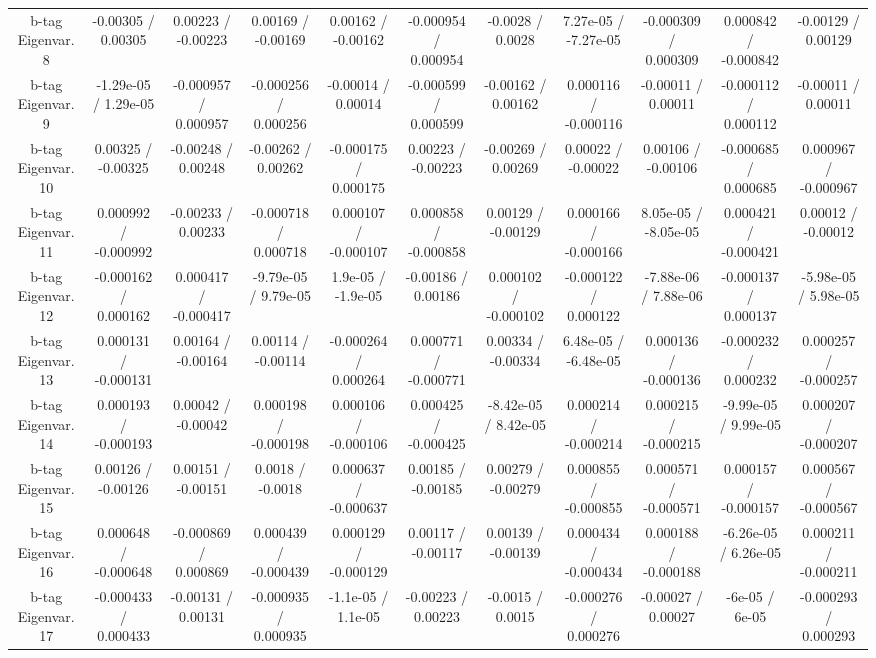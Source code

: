 \begin{table}[htbp]
\begin{center}
\begin{tabular}{|c|c|c|c|c|c|c|c|c|c|c|}
  b-tag Eigenvar. 8 & -0.00305 / 0.00305 & 0.00223 / -0.00223 & 0.00169 / -0.00169 & 0.00162 / -0.00162 & -0.000954 / 0.000954 & -0.0028 / 0.0028 & 7.27e-05 / -7.27e-05 & -0.000309 / 0.000309 & 0.000842 / -0.000842 & -0.00129 / 0.00129 \\ 
  b-tag Eigenvar. 9 & -1.29e-05 / 1.29e-05 & -0.000957 / 0.000957 & -0.000256 / 0.000256 & -0.00014 / 0.00014 & -0.000599 / 0.000599 & -0.00162 / 0.00162 & 0.000116 / -0.000116 & -0.00011 / 0.00011 & -0.000112 / 0.000112 & -0.00011 / 0.00011 \\ 
  b-tag Eigenvar. 10 & 0.00325 / -0.00325 & -0.00248 / 0.00248 & -0.00262 / 0.00262 & -0.000175 / 0.000175 & 0.00223 / -0.00223 & -0.00269 / 0.00269 & 0.00022 / -0.00022 & 0.00106 / -0.00106 & -0.000685 / 0.000685 & 0.000967 / -0.000967 \\ 
  b-tag Eigenvar. 11 & 0.000992 / -0.000992 & -0.00233 / 0.00233 & -0.000718 / 0.000718 & 0.000107 / -0.000107 & 0.000858 / -0.000858 & 0.00129 / -0.00129 & 0.000166 / -0.000166 & 8.05e-05 / -8.05e-05 & 0.000421 / -0.000421 & 0.00012 / -0.00012 \\ 
  b-tag Eigenvar. 12 & -0.000162 / 0.000162 & 0.000417 / -0.000417 & -9.79e-05 / 9.79e-05 & 1.9e-05 / -1.9e-05 & -0.00186 / 0.00186 & 0.000102 / -0.000102 & -0.000122 / 0.000122 & -7.88e-06 / 7.88e-06 & -0.000137 / 0.000137 & -5.98e-05 / 5.98e-05 \\ 
  b-tag Eigenvar. 13 & 0.000131 / -0.000131 & 0.00164 / -0.00164 & 0.00114 / -0.00114 & -0.000264 / 0.000264 & 0.000771 / -0.000771 & 0.00334 / -0.00334 & 6.48e-05 / -6.48e-05 & 0.000136 / -0.000136 & -0.000232 / 0.000232 & 0.000257 / -0.000257 \\ 
  b-tag Eigenvar. 14 & 0.000193 / -0.000193 & 0.00042 / -0.00042 & 0.000198 / -0.000198 & 0.000106 / -0.000106 & 0.000425 / -0.000425 & -8.42e-05 / 8.42e-05 & 0.000214 / -0.000214 & 0.000215 / -0.000215 & -9.99e-05 / 9.99e-05 & 0.000207 / -0.000207 \\ 
  b-tag Eigenvar. 15 & 0.00126 / -0.00126 & 0.00151 / -0.00151 & 0.0018 / -0.0018 & 0.000637 / -0.000637 & 0.00185 / -0.00185 & 0.00279 / -0.00279 & 0.000855 / -0.000855 & 0.000571 / -0.000571 & 0.000157 / -0.000157 & 0.000567 / -0.000567 \\ 
  b-tag Eigenvar. 16 & 0.000648 / -0.000648 & -0.000869 / 0.000869 & 0.000439 / -0.000439 & 0.000129 / -0.000129 & 0.00117 / -0.00117 & 0.00139 / -0.00139 & 0.000434 / -0.000434 & 0.000188 / -0.000188 & -6.26e-05 / 6.26e-05 & 0.000211 / -0.000211 \\ 
  b-tag Eigenvar. 17 & -0.000433 / 0.000433 & -0.00131 / 0.00131 & -0.000935 / 0.000935 & -1.1e-05 / 1.1e-05 & -0.00223 / 0.00223 & -0.0015 / 0.0015 & -0.000276 / 0.000276 & -0.00027 / 0.00027 & -6e-05 / 6e-05 & -0.000293 / 0.000293 \\ 

\end{tabular}
\end{center}
\end{table}
